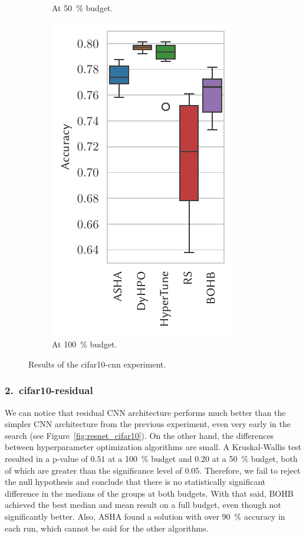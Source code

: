 \begin{figure}[H]
\begin{subfigure}{.26\textwidth}
        \caption{At \SI{50}{\percent} budget.}%
    \end{subfigure}%
    \begin{subfigure}{.26\textwidth}
        \includegraphics[height=\plotheight]{img/real_exp/cifar10_simple_boxplot_full.pdf}%
        \caption{At \SI{100}{\percent} budget.}%
    \end{subfigure}%
\caption{Results of the cifar10-cnn experiment.}
\label{fig:simple_cifar}
\end{figure}


\subsubsection{2.\ cifar10-residual}
We can notice that residual CNN architecture performs much better than the simpler CNN architecture from the previous experiment, even very early in the search (see Figure~\ref{fig:resnet_cifar10}). On the other hand, the differences between hyperparameter optimization algorithms are small. A Kruskal-Wallis test resulted in a p-value of $0.51$ at a \SI{100}{\percent} budget and $0.20$ at a \SI{50}{\percent} budget, both of which are greater than the significance level of $0.05$. Therefore, we fail to reject the null hypothesis and conclude that there is no statistically significant difference in the medians of the groups at both budgets. With that said, BOHB achieved the best median and mean result on a full budget, even though not significantly better. Also, ASHA found a solution with over \SI{90}{\percent} accuracy in each run, which cannot be said for the other algorithms.

